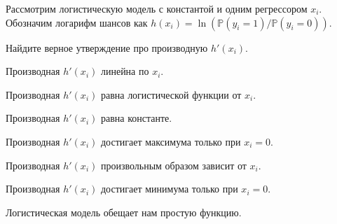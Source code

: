 
\begin{question}
Рассмотрим логистическую модель с константой и одним регрессором \(x_i\).
Обозначим логарифм шансов как \(h(x_i) = \ln (\mathbb{P}(y_i = 1) / \mathbb{P}(y_i = 0))\).

Найдите верное утверждение про производную \(h'(x_i)\).
\begin{answerlist}
  \item Производная \(h'(x_i)\) линейна по \(x_i\).
  \item Производная \(h'(x_i)\) равна логистической функции от \(x_i\).
  \item Производная \(h'(x_i)\) равна константе.
  \item Производная \(h'(x_i)\) достигает максимума только при \(x_i = 0\).
  \item Производная \(h'(x_i)\) произвольным образом зависит от \(x_i\).
  \item Производная \(h'(x_i)\) достигает минимума только при \(x_i = 0\).
\end{answerlist}
\end{question}

\begin{solution}
Логистическая модель обещает нам простую функцию.
\end{solution}

